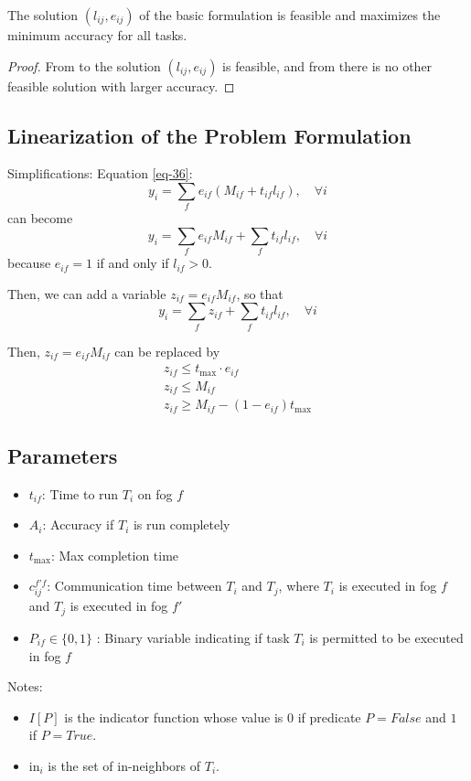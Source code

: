 \begin{theorem}
The solution $(l_{ij}, e_{ij})$ of the basic formulation is feasible and maximizes the minimum accuracy for all tasks.
\end{theorem}
\begin{proof}
From  to  the solution $(l_{ij}, e_{ij})$ is feasible, and from  there is no other feasible solution with larger accuracy.
\end{proof}

\subsection{Linearization of the Problem Formulation}

Simplifications: 
Equation \ref{eq-36}:
$$
y_i = \sum_f e_{if} \left( M_{if} + t_{if} l_{if} \right) , \quad \forall i
$$ 
can become 
$$
y_i = \sum_f e_{if} M_{if} + \sum_f t_{if} l_{if} , \quad \forall i
$$ 
because $e_{if}=1$ if and only if $l_{if}>0$.

Then, we can add a variable $z_{if}=e_{if} M_{if}$, so that
$$
y_i = \sum_f z_{if} + \sum_f t_{if} l_{if} , \quad \forall i
$$ 

Then, $z_{if}=e_{if} M_{if}$ can be replaced by
\begin{align}
    z_{if} \leq t_{\max} \cdot e_{if} \\
    z_{if} \leq M_{if} \\
    z_{if} \geq M_{if} - (1 - e_{if}) t_{\max}
\end{align}

\subsection{Parameters}
\begin{itemize}[leftmargin=*]
    \item $t_{if}$: Time to run $T_i$ on fog $f$
    \item $A_i$: Accuracy if $T_i$ is run completely
    \item $t_{\max}$: Max completion time
    \item $c_{ij}^{f'f}$: Communication time between $T_i$ and $T_j$, where $T_i$ is executed in fog $f$ and $T_j$ is executed in fog $f'$
    \item $P_{if} \in \{0,1\}$ : Binary variable indicating if task $T_i$ is permitted to be executed in fog $f$
\end{itemize}
Notes: 
\begin{itemize}[leftmargin=*]
    \item $I[P]$ is the indicator function whose value is $0$ if predicate $P=False$ and $1$ if $P=True$.
    \item $\text{in}_i$ is the set of in-neighbors of $T_i$.
\end{itemize}

